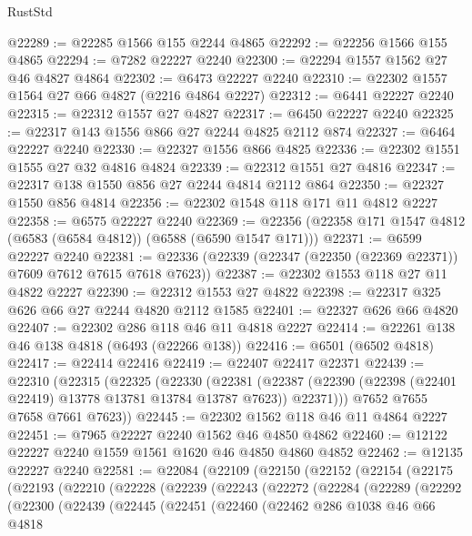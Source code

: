 \begin{lexlean}{RustStd}
\begin{coremodule}
@22289 := @22285 @1566 @155 @2244 @4865
@22292 := @22256 @1566 @155 @4865
@22294 := @7282 @22227 @2240
@22300 := @22294 @1557 @1562 @27 @46 @4827 @4864
@22302 := @6473 @22227 @2240
@22310 := @22302 @1557 @1564 @27 @66 @4827 (@2216 @4864 @2227)
@22312 := @6441 @22227 @2240
@22315 := @22312 @1557 @27 @4827
@22317 := @6450 @22227 @2240
@22325 := @22317 @143 @1556 @866 @27 @2244 @4825 @2112 @874
@22327 := @6464 @22227 @2240
@22330 := @22327 @1556 @866 @4825
@22336 := @22302 @1551 @1555 @27 @32 @4816 @4824
@22339 := @22312 @1551 @27 @4816
@22347 := @22317 @138 @1550 @856 @27 @2244 @4814 @2112 @864
@22350 := @22327 @1550 @856 @4814
@22356 := @22302 @1548 @118 @171 @11 @4812 @2227
@22358 := @6575 @22227 @2240
@22369 := @22356 (@22358 @171 @1547 @4812 (@6583 (@6584 @4812)) (@6588 (@6590 @1547 @171)))
@22371 := @6599 @22227 @2240
@22381 := @22336 (@22339 (@22347 (@22350 (@22369 @22371)) @7609 @7612 @7615 @7618 @7623))
@22387 := @22302 @1553 @118 @27 @11 @4822 @2227
@22390 := @22312 @1553 @27 @4822
@22398 := @22317 @325 @626 @66 @27 @2244 @4820 @2112 @1585
@22401 := @22327 @626 @66 @4820
@22407 := @22302 @286 @118 @46 @11 @4818 @2227
@22414 := @22261 @138 @46 @138 @4818 (@6493 (@22266 @138))
@22416 := @6501 (@6502 @4818)
@22417 := @22414 @22416
@22419 := @22407 @22417 @22371
@22439 := @22310
    (@22315
      (@22325
        (@22330
          (@22381
            (@22387 (@22390 (@22398 (@22401 @22419) @13778 @13781 @13784 @13787 @7623)) @22371)))
        @7652
        @7655
        @7658
        @7661
        @7623))
@22445 := @22302 @1562 @118 @46 @11 @4864 @2227
@22451 := @7965 @22227 @2240 @1562 @46 @4850 @4862
@22460 := @12122 @22227 @2240 @1559 @1561 @1620 @46 @4850 @4860 @4852
@22462 := @12135 @22227 @2240
@22581 := @22084
    (@22109
      (@22150
        (@22152
          (@22154
            (@22175
              (@22193
                (@22210
                  (@22228
                    (@22239
                      (@22243
                        (@22272
                          (@22284
                            (@22289
                              (@22292
                                (@22300
                                  (@22439
                                    (@22445
                                      (@22451
                                        (@22460
                                          (@22462
                                            @286
                                            @1038
                                            @46
                                            @66
                                            @4818

\end{coremodule}
\end{lexlean}

